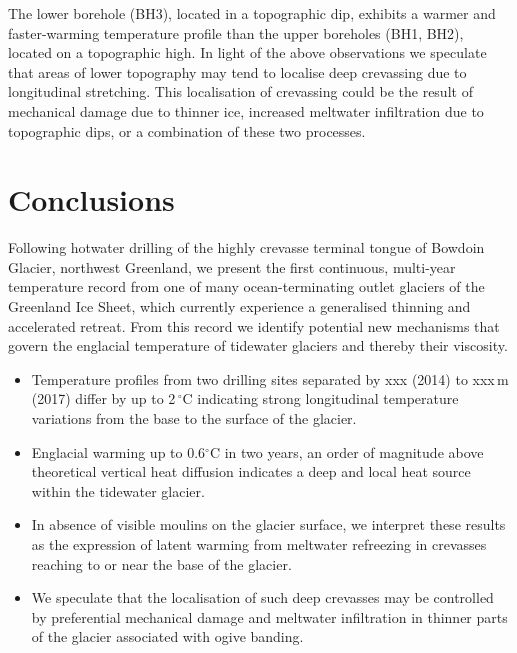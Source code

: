 \documentclass[utf8]{article}
\begin{document}
    The lower borehole (BH3), located in a topographic dip, exhibits a warmer
    and faster-warming temperature profile than the upper boreholes (BH1, BH2),
    located on a topographic high. In light of the above observations we
    speculate that areas of lower topography may tend to localise deep
    crevassing due to longitudinal stretching. This localisation of crevassing
    could be the result of mechanical damage due to thinner ice, increased
    meltwater infiltration due to topographic dips, or a combination of these
    two processes.


\section{Conclusions}

    Following hotwater drilling of the highly crevasse terminal tongue of
    Bowdoin Glacier, northwest Greenland, we present the first continuous,
    multi-year temperature record from one of many ocean-terminating outlet
    glaciers of the Greenland Ice Sheet, which currently experience a
    generalised thinning and accelerated retreat. From this record we identify
    potential new mechanisms that govern the englacial temperature of tidewater
    glaciers and thereby their viscosity.

    \begin{itemize}

      \item Temperature profiles from two drilling sites separated by xxx
        (2014) to xxx\,m (2017) differ by up to 2\,$^\circ$C indicating strong
        longitudinal temperature variations from the base to the surface of
        the glacier.

      \item Englacial warming up to 0.6$^\circ$C in two years, an order of
        magnitude above theoretical vertical heat diffusion indicates a deep
        and local heat source within the tidewater glacier.

      \item In absence of visible moulins on the glacier surface, we interpret
        these results as the expression of latent warming from meltwater
        refreezing in crevasses reaching to or near the base of the glacier.

      \item We speculate that the localisation of such deep crevasses may be
        controlled by preferential mechanical damage and meltwater infiltration
        in thinner parts of the glacier associated with ogive banding.

    \end{itemize}
\end{document}
